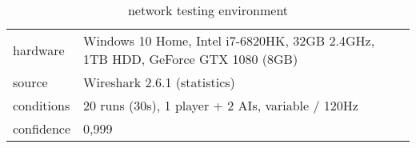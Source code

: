 \begin{table}[!ht]
	\centering
    \begin{tabular}{l|l}
        hardware & Windows 10 Home, Intel i7-6820HK, 32GB 2.4GHz, 1TB HDD, GeForce GTX 1080 (8GB) \\
		source & Wireshark 2.6.1 (statistics) \\
		conditions & 20 runs (30s), 1 player + 2 AIs, variable / 120Hz \\
		confidence & 0,999 \\
    \end{tabular}

    \caption{network testing environment}\label{tb:performance:network}
\end{table}
